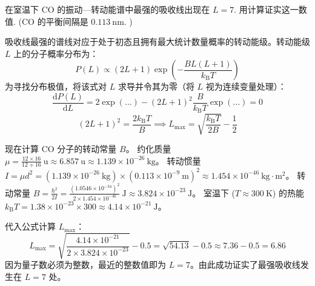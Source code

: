 \begin{exercise}\label{ex:26.10}
在室温下 $\mathrm{CO}$ 的振动—转动能谱中最强的吸收线出现在 $L=7$. 用计算证实这一数值. ($\mathrm{CO}$ 的平衡间隔是 $0.113 \ \mathrm{nm}$. )
\end{exercise}
\begin{solution}
吸收线最强的谱线对应于处于初态且拥有最大统计数量概率的转动能级。转动能级 $L$ 上的分子概率分布为：
$$ P(L) \propto (2L+1) \exp\left( - \frac{B L(L+1)}{k_{\mathrm{B}} T} \right) $$
为寻找分布极值，将该式对 $L$ 求导并令其为零（将 $L$ 视为连续变量处理）：
$$ \frac{\mathrm{d}P(L)}{\mathrm{d}L} = 2 \exp(\dots) - (2L+1)^2 \frac{B}{k_{\mathrm{B}} T} \exp(\dots) = 0 $$
$$ (2L+1)^2 = \frac{2k_{\mathrm{B}} T}{B} \implies L_{\max} = \sqrt{\frac{k_{\mathrm{B}} T}{2B}} - \frac{1}{2} $$

现在计算 $\mathrm{CO}$ 分子的转动常量 $B$。
约化质量 $\mu = \frac{12 \times 16}{12 + 16} \ \mathrm{u} \approx 6.857 \ \mathrm{u} \approx 1.139 \times 10^{-26} \ \mathrm{kg}$。
转动惯量 $I = \mu d^2 = (1.139 \times 10^{-26} \ \mathrm{kg}) \times (0.113 \times 10^{-9} \ \mathrm{m})^2 \approx 1.454 \times 10^{-46} \ \mathrm{kg \cdot m^2}$。
转动常量 $B = \frac{\hbar^2}{2I} = \frac{(1.0546 \times 10^{-34})^2}{2 \times 1.454 \times 10^{-46}} \ \mathrm{J} \approx 3.824 \times 10^{-23} \ \mathrm{J}$。
室温下 ($T \approx 300 \ \mathrm{K}$) 的热能 $k_{\mathrm{B}} T = 1.38 \times 10^{-23} \times 300 \approx 4.14 \times 10^{-21} \ \mathrm{J}$。

代入公式计算 $L_{\max}$：
$$ L_{\max} = \sqrt{\frac{4.14 \times 10^{-21}}{2 \times 3.824 \times 10^{-23}}} - 0.5 = \sqrt{54.13} - 0.5 \approx 7.36 - 0.5 = 6.86 $$
因为量子数必须为整数，最近的整数值即为 $L = 7$。由此成功证实了最强吸收线发生在 $L = 7$ 处。
\end{solution}

